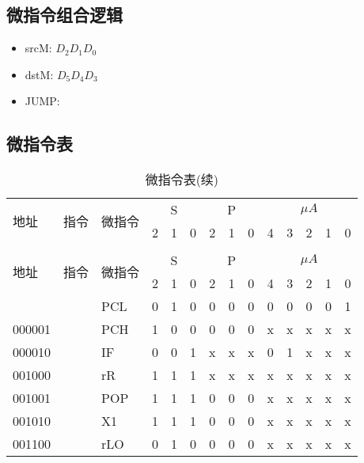 \documentclass[10pt]{book}
\begin{document}
\subsection{微指令组合逻辑}
\begin{itemize}
  \item srcM: $D_{2}D_{1}D_{0}$
  \item dstM: $D_{5}D_{4}D_{3}$
  \item JUMP: 
\end{itemize}

\subsection{微指令表}
\begin{longtable}{|l|l|l|c|c|c|c|c|c|c|c|c|c|c|}
\caption{微指令表} \label{tb_micro_prog} \\
\hline
\multirow{2}{1cm}{地址} & \multirow{2}{1.5cm}{指令} & \multirow{2}{1.5cm}{微指令} & \multicolumn{3}{c|}{S} & \multicolumn{3}{c|}{P} & \multicolumn {5}{c|}{$\mu A$} \\
\cline{4-14}
                       &             &             & 2 & 1 & 0 & 2 & 1 & 0 & 4 & 3 & 2 & 1 & 0 \\
\hline
\endfirsthead
\caption{微指令表(续)} \\
\hline
\multirow{2}{1cm}{地址} & \multirow{2}{1.5cm}{指令} & \multirow{2}{1.5cm}{微指令} & \multicolumn{3}{c|}{S} & \multicolumn{3}{c|}{P} & \multicolumn {5}{c|}{$\mu A$} \\
\cline{4-14}
                       &             &             & 2 & 1 & 0 & 2 & 1 & 0 & 4 & 3 & 2 & 1 & 0 \\
\hline
\endhead
\hline
\endfoot
000000	&  			& PCL		& 0 & 1 & 0   & 0 & 0 & 0   & 0 & 0 & 0 & 0 & 1 \\
000001 	& 			& PCH		& 1 & 0 & 0   & 0 & 0 & 0   & x & x & x & x & x \\
000010 	& 			& IF   		& 0 & 0 & 1   & x & x & x   & 0 & 1 & x & x & x \\
001000 	& 			& rR   		& 1 & 1 & 1   & x & x & x   & x & x & x & x & x \\
001001 	& 			& POP  		& 1 & 1 & 1   & 0 & 0 & 0   & x & x & x & x & x \\
001010 	& 			& X1   		& 1 & 1 & 1   & 0 & 0 & 0   & x & x & x & x & x \\
001100 	& 			& rLO		& 0 & 1 & 0   & 0 & 0 & 0	& x & x & x & x & x \\

\end{longtable}
\end{document}
